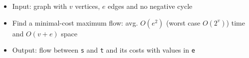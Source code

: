 \begin{itemize}
	\item Input: graph with $v$ vertices, $e$ edges and no negative cycle
	\item Find a minimal-cost maximum flow: avg. $O(e^2)$ (worst case $O(2^v)$) time and $O(v+e)$ space
	\item Output: flow between \lstinline{s} and \lstinline{t} and its costs with values in \lstinline{e}
\end{itemize}
